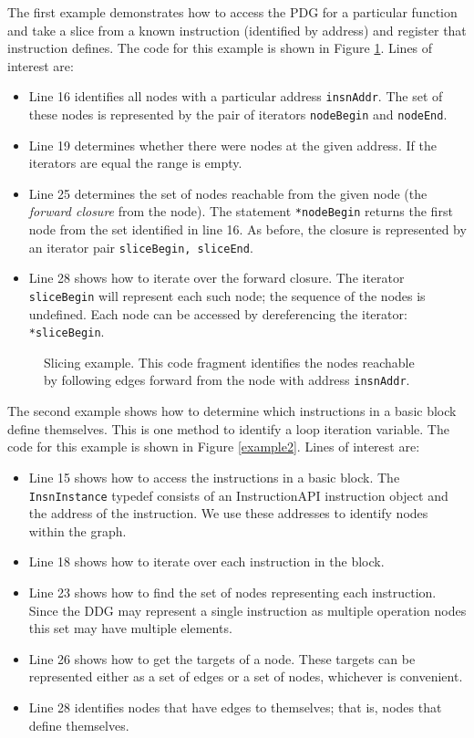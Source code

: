 \documentclass[12pt]{article}
\begin{document}
The first example demonstrates how to access the PDG for a particular
function and take a slice from a known instruction (identified by
address) and register that instruction defines. The code for this
example is shown in Figure \ref{example1}. Lines of interest are:
\begin{itemize}
\item Line 16 identifies all nodes with a particular address
  \texttt{insnAddr}. The set of these nodes is represented by the pair
  of iterators \texttt{nodeBegin} and \texttt{nodeEnd}.
\item Line 19 determines whether there were nodes at the given
  address. If the iterators are equal the range is empty.
\item Line 25 determines the set of nodes reachable from the given
  node (the \emph{forward closure} from the node). The statement
  \texttt{*nodeBegin} returns the first node from the set identified
  in line 16. As before, the closure is represented by an iterator
  pair \texttt{sliceBegin, sliceEnd}. 
\item Line 28 shows how to iterate over the forward closure. The
  iterator \texttt{sliceBegin} will represent each such node; the
  sequence of the nodes is undefined. Each node can be accessed by
  dereferencing the iterator: \texttt{*sliceBegin}.
\end{itemize}

\begin{figure}\label{example1}

\caption{Slicing example. This code fragment identifies the nodes
  reachable by following edges forward from the node with address
  \texttt{insnAddr}.}
\end{figure}


The second example shows how to determine which instructions in a
basic block define themselves. This is one method to identify a loop
iteration variable. The code for this example is shown in Figure
\ref{example2}. Lines of interest are:
\begin{itemize}
\item Line 15 shows how to access the instructions in a basic
  block. The \texttt{InsnInstance} typedef consists of an
  InstructionAPI instruction object and the address of the
  instruction. We use these addresses to identify nodes within the
  graph.
\item Line 18 shows how to iterate over each instruction in the block.
\item Line 23 shows how to find the set of nodes representing each
  instruction. Since the DDG may represent a single instruction as
  multiple operation nodes this set may have multiple elements. 
\item Line 26 shows how to get the targets of a node. These targets
  can be represented either as a set of edges or a set of nodes,
  whichever is convenient. 
\item Line 28 identifies nodes that have edges to themselves; that is,
  nodes that define themselves. 
\end{itemize}
\end{document}
